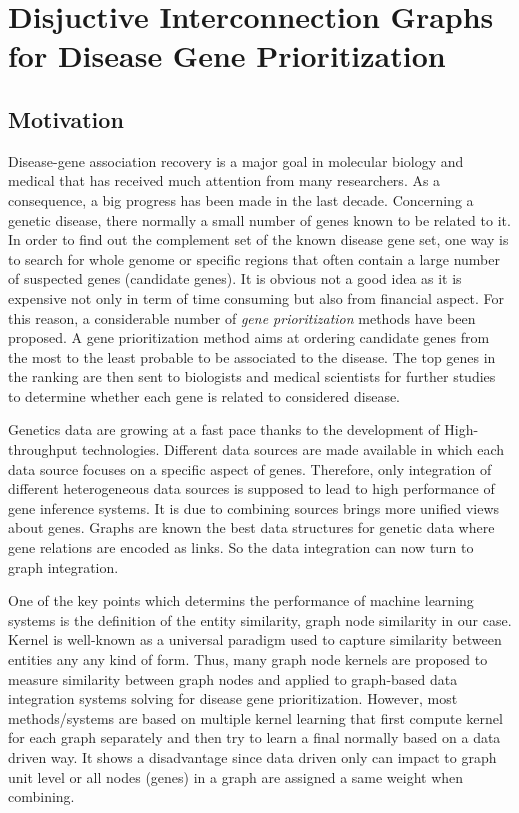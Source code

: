 \chapter{Disjuctive Interconnection Graphs for Disease Gene Prioritization}
\label{chap:digi}
\section{Motivation}
Disease-gene association recovery is a major goal in molecular biology and medical that has received much attention from many researchers. As a consequence, a big progress has been made in the last decade. Concerning a genetic disease, there normally a small number of genes known to be related to it. In order to find out the complement set of the known disease gene set, one way is to search for whole genome or specific regions that often contain a large number of suspected genes (candidate genes). It is obvious not a good idea as it is expensive not only in term of time consuming but also from financial aspect. For this reason, a considerable number of \textit{gene prioritization} methods have been proposed. A gene prioritization method aims at ordering candidate genes from the most to the least probable to be associated to the disease. The top genes in the ranking are then sent to biologists and medical scientists for further studies to determine whether each gene is related to considered disease.

Genetics data are growing at a fast pace thanks to the development of High-throughput technologies. Different data sources are made available in which each data source focuses on a specific aspect of genes. Therefore, only integration of different heterogeneous data sources is supposed to lead to high performance of gene inference systems. It is due to combining sources brings more unified views about genes. Graphs are known the best data structures for genetic data where gene relations are encoded as links. So the data integration can now turn to graph integration. 

One of the key points which determins the performance of machine learning systems is the definition of the entity similarity, graph node similarity in our case. Kernel is well-known as a universal paradigm used to capture similarity between entities any any kind of form. Thus, many graph node kernels are proposed to measure similarity between graph nodes and applied to graph-based data integration systems solving for disease gene prioritization. However, most methods/systems are based on multiple kernel learning that first compute kernel for each graph separately and then try to learn a final normally based on a data driven way. It shows a disadvantage since data driven only can impact to graph unit level or all nodes (genes) in a graph are assigned a same weight when combining. 

